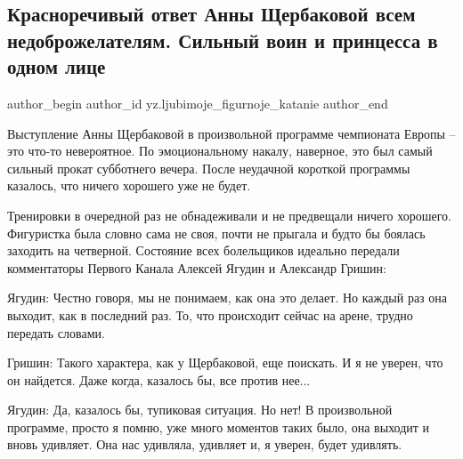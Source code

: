  
 
 
 
 
\subsection{Красноречивый ответ Анны Щербаковой всем недоброжелателям. Сильный воин и принцесса в одном лице}
\label{sec:16_01_2022.yz.ljubimoje_figurnoje_katanie.1.anna_scherbakova}


\ifcmt
 author_begin
   author_id yz.ljubimoje_figurnoje_katanie
 author_end
\fi

Выступление Анны Щербаковой в произвольной программе чемпионата Европы – это
что-то невероятное. По эмоциональному накалу, наверное, это был самый сильный
прокат субботнего вечера. После неудачной короткой программы казалось, что
ничего хорошего уже не будет.


Тренировки в очередной раз не обнадеживали и не предвещали ничего хорошего.
Фигуристка была словно сама не своя, почти не прыгала и будто бы боялась
заходить на четверной. Состояние всех болельщиков идеально передали
комментаторы Первого Канала Алексей Ягудин и Александр Гришин:

Ягудин: Честно говоря, мы не понимаем, как она это делает. Но каждый раз она
выходит, как в последний раз. То, что происходит сейчас на арене, трудно
передать словами.

Гришин: Такого характера, как у Щербаковой, еще поискать. И я не уверен, что он
найдется. Даже когда, казалось бы, все против нее...

Ягудин: Да, казалось бы, тупиковая ситуация. Но нет! В произвольной программе,
просто я помню, уже много моментов таких было, она выходит и вновь удивляет.
Она нас удивляла, удивляет и, я уверен, будет удивлять.

